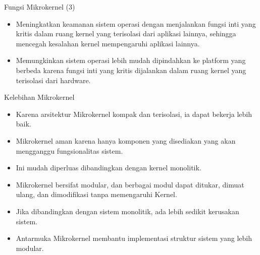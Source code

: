 \documentclass[aspectratio=169, table]{beamer}
\begin{document}
	\begin{frame}{Fungsi Mikrokernel (3)}
		\begin{itemize}
				\item Meningkatkan keamanan sistem operasi dengan menjalankan fungsi inti yang kritis dalam ruang kernel yang terisolasi dari aplikasi lainnya, sehingga mencegah kesalahan kernel mempengaruhi aplikasi lainnya.
			
			\item Memungkinkan sistem operasi lebih mudah dipindahkan ke platform yang berbeda karena fungsi inti yang kritis dijalankan dalam ruang kernel yang terisolasi dari hardware.
		\end{itemize}
	\end{frame}
	
	
	
	\begin{frame}{Kelebihan Mikrokernel}
		\begin{itemize}
			
			\item Karena arsitektur Mikrokernel kompak dan terisolasi, ia dapat bekerja lebih baik.
			
			\item Mikrokernel aman karena hanya komponen yang disediakan yang akan mengganggu fungsionalitas sistem. 
			
			\item Ini mudah diperluas dibandingkan dengan kernel monolitik. 
			
			\item Mikrokernel bersifat modular, dan berbagai modul dapat ditukar, dimuat ulang, dan dimodifikasi tanpa memengaruhi Kernel.
			
			\item Jika dibandingkan dengan sistem monolitik, ada lebih sedikit kerusakan sistem.
			
			\item Antarmuka Mikrokernel membantu implementasi struktur sistem yang lebih modular.
			
		
		\end{itemize}
	\end{frame}
\end{document}
